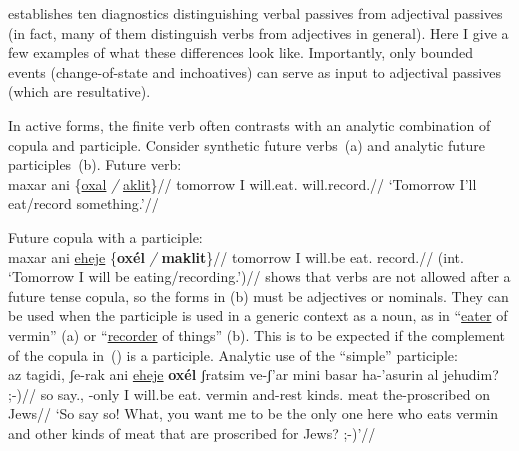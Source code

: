 \cite{doron00} establishes ten diagnostics distinguishing verbal passives from adjectival passives (in fact, many of them distinguish verbs from adjectives in general). Here I give a few examples of what these differences look like. Importantly, only bounded events (change-of-state and inchoatives) can serve as input to adjectival passives (which are resultative).

In active forms, the finite verb often contrasts with an analytic combination of copula and participle. Consider synthetic future verbs~(\nextx a) and analytic future participles~(\nextx b).
\pex \label{ex:pres-act}
 \a Future verb:\\
 \begingl
     \gla maxar ani \{\underline{oxal} \emph{/} \underline{aklit}\}//
     \glb tomorrow I will.eat. {} will.record.//
     \glft `Tomorrow I'll eat/record something.'//
 \endgl

 \a Future copula with a participle:\\
 \begingl
     \gla \ljudge{*}maxar ani \underline{eheje} \{\textbf{ox\'el} \emph{/} \textbf{maklit}\}//
     \glb tomorrow I will.be eat. {} record.//
     \glft (int. `Tomorrow I will be eating/recording.')//
 \endgl
\xe
\cite{doron00} shows that verbs are not allowed after a future tense copula, so the forms in (\lastx b) must be adjectives or nominals. They can be used when the participle is used in a generic context as a noun, as in ``\underline{eater} of vermin'' (\nextx a) or ``\underline{recorder} of things'' (\nextx b). This is to be expected if the complement of the copula in~(\nextx) is a participle.
\pex \label{ex:pres-act2}
 \a Analytic use of the ``simple'' participle:\\
 \begingl
     \gla az tagidi, ʃe-rak ani \underline{eheje} \textbf{ox\'el} ʃratsim ve-ʃ'ar mini basar ha-'asurin al jehudim? ;-)//
     \glb so say., -only I will.be eat. vermin and-rest kinds. meat the-proscribed on Jews//
     \glft `So say so! What, you want me to be the only one here who eats vermin and other kinds of meat that are proscribed for Jews? ;-)'\footnotemark//
 \endgl
{}

